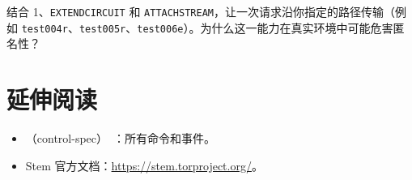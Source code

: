 \begin{esercizio}[3]\label{es:18-percorso}
结合  1、\texttt{EXTENDCIRCUIT} 和 \texttt{ATTACHSTREAM}，让一次请求沿你指定的路径传输（例如 \texttt{test004r}、\texttt{test005r}、\texttt{test006e}）。为什么这一能力在真实环境中可能危害匿名性？
\end{esercizio}

\section*{延伸阅读}
\begin{itemize}
  \item {}（control-spec）~\cite{torspec}：所有命令和事件。
  \item Stem 官方文档：\url{https://stem.torproject.org/}。
\end{itemize}
